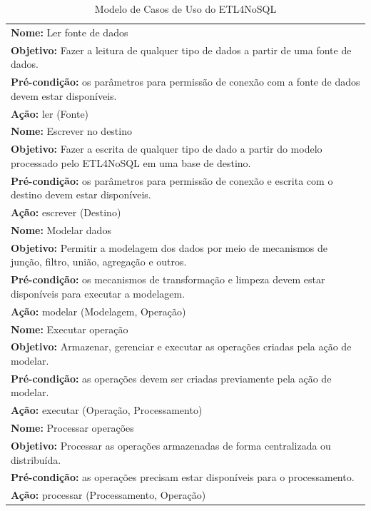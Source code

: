 \begin{table}[h!]
	\centering
	\caption{Modelo de Casos de Uso do ETL4NoSQL}
	\label{casosdeuso}
	\begin{tabular}{|p{14cm}|}
		\hline
			\textbf{Nome:} Ler fonte de dados\\ 
			\textbf{Objetivo:} Fazer a leitura de qualquer tipo de dados a partir de uma fonte de dados.\\ 
			\textbf{Pré-condição:} os parâmetros para permissão de conexão com a fonte de dados devem estar disponíveis.\\ 
			\textbf{Ação:} ler (Fonte)\\ 
		\hline
			\textbf{Nome:} Escrever no destino\\ 
			\textbf{Objetivo:} Fazer a escrita de qualquer tipo de dado a partir do modelo processado pelo ETL4NoSQL em uma base de destino.\\ 
			\textbf{Pré-condição:} os parâmetros para permissão de conexão e escrita com o destino devem estar disponíveis.\\ 
			\textbf{Ação:} escrever (Destino)  \\ 
	\hline
			\textbf{Nome:} Modelar dados\\ 
			\textbf{Objetivo:} Permitir a modelagem dos dados por meio de mecanismos de junção, filtro, união, agregação e outros. \\
			 \textbf{Pré-condição:} os mecanismos de transformação e limpeza devem estar disponíveis para executar a modelagem.\\ 
			 \textbf{Ação:} modelar (Modelagem, Operação)\\ 
	 \hline
	 		\textbf{Nome:} Executar operação\\ 
	 		\textbf{Objetivo:} Armazenar, gerenciar e executar as operações criadas pela ação de modelar.\\
	 		\textbf{Pré-condição:} as operações devem ser criadas previamente pela ação de modelar.\\ 
	 		\textbf{Ação:} executar (Operação, Processamento)\\ 
	 \hline
	 	\textbf{Nome:} Processar operações\\ 
	 	\textbf{Objetivo:} Processar as operações armazenadas de forma centralizada ou distribuída.\\
	 	\textbf{Pré-condição:} as operações precisam estar disponíveis para o processamento.\\ 
	 	\textbf{Ação:} processar (Processamento, Operação)\\ 
	 \hline
	 
	\end{tabular}
\end{table}

